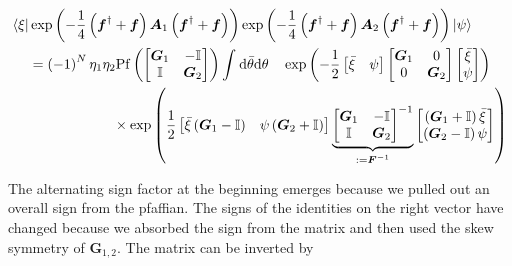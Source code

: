 \documentclass{article}
\begin{document}
	\begin{align}
		\bra{\xi} &\exp \left( -\frac{1}{4}\left( \boldsymbol{f}^\dagger + \boldsymbol{f} \right) \boldsymbol{A}_{1} \left( \boldsymbol{f}^\dagger + \boldsymbol{f} \right) \right) \exp \left( -\frac{1}{4}\left( \boldsymbol{f}^\dagger + \boldsymbol{f} \right) \boldsymbol{A}_{2} \left( \boldsymbol{f}^\dagger + \boldsymbol{f} \right) \right) \ket{\psi} \nonumber \\
		&=\left(-1\right)^{N}\eta_1\eta_2\mathrm{Pf} \left(\begin{bmatrix}
			\boldsymbol{G}_{1} & -\mathbb{I} \\
			\mathbb{I} & \boldsymbol{G}_{2} 
		\end{bmatrix} \right) \int_{ }^{ } \mathrm{d}\bar{\theta}\mathrm{d} \theta \quad \exp \left(-\frac{1}{2}\begin{bmatrix}
			\bar{\xi}&\psi
		\end{bmatrix}
		\begin{bmatrix}
			\boldsymbol{G}_{1} & 0 \\
			0 & \boldsymbol{G}_{2} 
		\end{bmatrix} 
		\begin{bmatrix}
			\bar{\xi}\\ \psi
		\end{bmatrix} \right) \nonumber \\
		&\quad\quad\quad\quad\quad\quad \times \exp \left( \frac{1}{2}\begin{bmatrix}
			\bar{\xi}\left(\boldsymbol{G}_{1} - \mathbb{I}\right)& \psi \left( \boldsymbol{G}_{2}+\mathbb{I}\right) 
		\end{bmatrix} \underbrace{\begin{bmatrix}
		\boldsymbol{G}_{1}& -\mathbb{I} \\
		\mathbb{I} & \boldsymbol{G}_{2} 
		\end{bmatrix}^{-1}}_{:=\boldsymbol{F}^{-1} }\begin{bmatrix}
		\left(\boldsymbol{G}_{1} + \mathbb{I}\right)\bar{\xi} \\
				\left(\boldsymbol{G}_{2} - \mathbb{I}\right) \psi
		\end{bmatrix}   \right)  
	\end{align}
	
	
	
	The alternating sign factor at the beginning emerges because we pulled out an overall sign from the pfaffian. The signs of the identities on the right vector have changed because we absorbed the sign from the matrix and then used the skew symmetry of $\boldsymbol{G}_{1,2}$. The matrix can be inverted by
	
\end{document}

